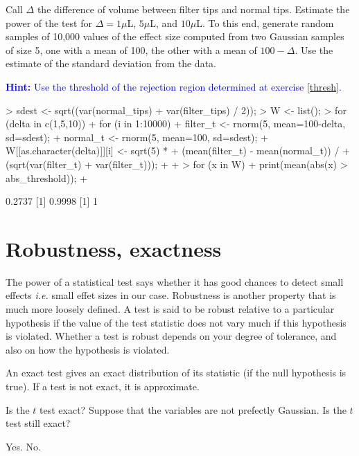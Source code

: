 \documentclass[a4paper]{article}
\theoremstyle{definition}
\begin{document}
\begin{Exercise}
Call $\Delta$ the difference of volume between filter tips and normal
tips. Estimate the power of the test for $\Delta = 1 \mu$L, $5 \mu$L,
and $10 \mu$L. To this end, generate random samples of 10,000 values
of the effect size computed from two Gaussian samples of size 5, one
with a mean of 100, the other with a mean of $100 - \Delta$. Use
the estimate of the standard deviation from the data.
\par\noindent\textcolor{Blue}{\textbf{Hint:} Use the threshold
of the rejection region determined at exercise \ref{thresh}.}
\end{Exercise}
\begin{Answer}
\begin{Schunk}
\begin{Sinput}
> sdest <- sqrt((var(normal_tips) + var(filter_tips) / 2));
> W <- list();
> for (delta in c(1,5,10)) {
+    for (i in 1:10000) {
+       filter_t <- rnorm(5, mean=100-delta, sd=sdest);
+       normal_t <- rnorm(5, mean=100, sd=sdest);
+       W[[as.character(delta)]][i] <- sqrt(5) *
+          (mean(filter_t) - mean(normal_t)) /
+          (sqrt(var(filter_t) + var(filter_t)));
+    }
+ }
> for (x in W) {
+    print(mean(abs(x) > abs_threshold));
+ }
\end{Sinput}
\begin{Soutput}
[1] 0.2737
[1] 0.9998
[1] 1
\end{Soutput}
\end{Schunk}
\end{Answer}

\section{Robustness, exactness}

The power of a statistical test says whether it has good chances to
detect small effects \textit{i.e.} small effet sizes in our case.
Robustness is another property that is much more loosely defined.
A test is said to be robust relative to a particular hypothesis if
the value of the test statistic does not vary much if this
hypothesis is violated. Whether a test is robust depends on your
degree of tolerance, and also on how the hypothesis is violated.

An exact test gives an exact distribution of its statistic (if the
null hypothesis is true). If a test is not exact, it is approximate.

\begin{Exercise}
Is the $t$ test exact? Suppose that the variables are not prefectly
Gaussian. Is the $t$ test still exact?
\end{Exercise}
\begin{Answer}
Yes. No.
\end{Answer}
\end{document}
